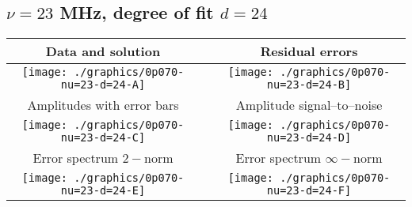 

% 

\clearpage{}
\break{}

\subsection{$\nu = 23$ MHz, degree of fit $d = 24$}

\begin{table}[h]
    \begin{center}
        \begin{tabular}{ccc}
            Data and solution & \quad & Residual errors \\\hline
            \texttt{[image: ./graphics/0p070-nu=23-d=24-A]} &&
            \texttt{[image: ./graphics/0p070-nu=23-d=24-B]} \\[15pt]
            Amplitudes with error bars && Amplitude signal--to--noise \\\hline
            \texttt{[image: ./graphics/0p070-nu=23-d=24-C]} &&
            \texttt{[image: ./graphics/0p070-nu=23-d=24-D]} \\[15pt]
            Error spectrum $2-$norm && Error spectrum $\infty-$norm \\\hline
            \texttt{[image: ./graphics/0p070-nu=23-d=24-E]} &&
            \texttt{[image: ./graphics/0p070-nu=23-d=24-F]} \\[15pt]
        \end{tabular}
    \end{center}
\label{fig:elev=70, nu=23}
\end{table}



\endinput
